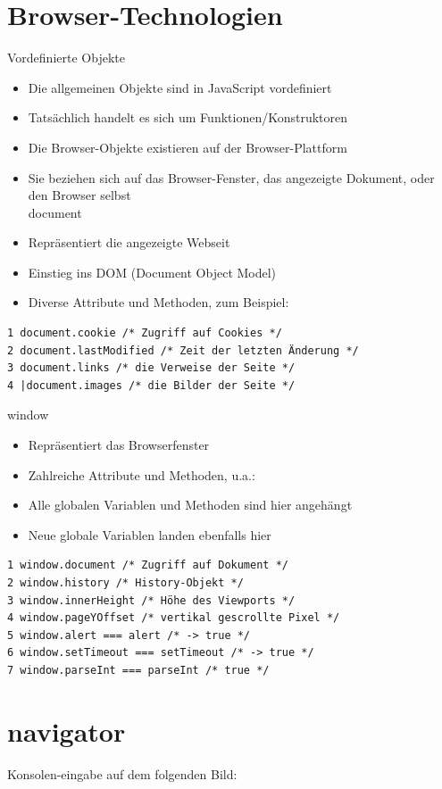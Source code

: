 \section{Browser-Technologien}
Vordefinierte Objekte

\begin{itemize}
  \item Die allgemeinen Objekte sind in JavaScript vordefiniert
  \item Tatsächlich handelt es sich um Funktionen/Konstruktoren
  \item Die Browser-Objekte existieren auf der Browser-Plattform
  \item Sie beziehen sich auf das Browser-Fenster, das angezeigte Dokument, oder den Browser selbst\\
document
  \item Repräsentiert die angezeigte Webseit
  \item Einstieg ins DOM (Document Object Model)
  \item Diverse Attribute und Methoden, zum Beispiel:
\end{itemize}

\begin{verbatim}
1 document.cookie /* Zugriff auf Cookies */
2 document.lastModified /* Zeit der letzten Änderung */
3 document.links /* die Verweise der Seite */
4 |document.images /* die Bilder der Seite */
\end{verbatim}

window

\begin{itemize}
  \item Repräsentiert das Browserfenster
  \item Zahlreiche Attribute und Methoden, u.a.:
  \item Alle globalen Variablen und Methoden sind hier angehängt
  \item Neue globale Variablen landen ebenfalls hier
\end{itemize}

\begin{verbatim}
1 window.document /* Zugriff auf Dokument */
2 window.history /* History-Objekt */
3 window.innerHeight /* Höhe des Viewports */
4 window.pageYOffset /* vertikal gescrollte Pixel */
5 window.alert === alert /* -> true */
6 window.setTimeout === setTimeout /* -> true */
7 window.parseInt === parseInt /* true */
\end{verbatim}

\section*{navigator}
Konsolen-eingabe auf dem folgenden Bild:

